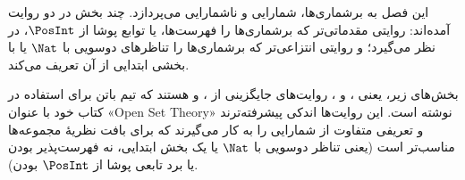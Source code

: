 \documentclass[../../../include/open-logic-chapter]{subfiles}
\begin{document}

\begin{editorial}
این فصل به برشماری‌ها، شمارایی و ناشمارایی می‌پردازد. چند بخش در دو
روایت آمده‌اند: روایتی مقدماتی‌تر که برشماری‌ها را فهرست‌ها، یا توابع
پوشا از $\PosInt$، در نظر می‌گیرد؛ و روایتی انتزاعی‌تر که برشماری‌ها را
تناظرهای دوسویی با $\Nat$ یا با بخشی ابتدایی از آن تعریف می‌کند.
\end{editorial}











\begin{editorial}
بخش‌های زیر، یعنی ،
 و ،
روایت‌های جایگزینی از ،
 و  هستند که تیم
باتن برای استفاده در کتاب خود با عنوان «Open Set Theory» نوشته
است. این روایت‌ها اندکی پیشرفته‌ترند و تعریفی متفاوت از
شمارایی را به کار می‌گیرند که برای بافت نظریهٔ مجموعه‌ها مناسب‌تر
است (یعنی تناظر دوسویی با $\Nat$ یا یک بخش ابتدایی، نه
فهرست‌پذیر بودن یا برد تابعی پوشا از $\PosInt$ بودن).
\end{editorial}


\OLEndChapterHook
\end{document}
